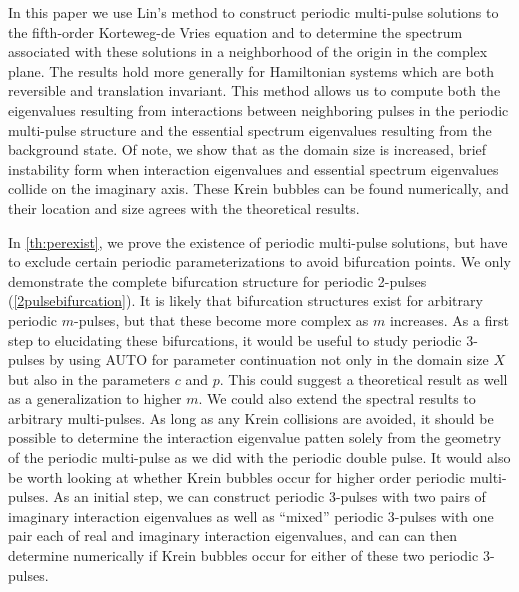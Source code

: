 \documentclass[10pt,reqno]{amsart}
\theoremstyle{plain}
\theoremstyle{definition}
\theoremstyle{remark}
\numberwithin{theorem}{section}
\numberwithin{equation}{section}
\begin{document}
In this paper we use Lin's method to construct periodic multi-pulse solutions to the fifth-order Korteweg-de Vries equation and to determine the spectrum associated with these solutions in a neighborhood of the origin in the complex plane. The results hold more generally for Hamiltonian systems which are both reversible and translation invariant. This method allows us to compute both the eigenvalues resulting from interactions between neighboring pulses in the periodic multi-pulse structure and the essential spectrum eigenvalues resulting from the background state. Of note, we show that as the domain size is increased, brief instability form when interaction eigenvalues and essential spectrum eigenvalues collide on the imaginary axis. These Krein bubbles can be found numerically, and their location and size agrees with the theoretical results.

In \cref{th:perexist}, we prove the existence of periodic multi-pulse solutions, but have to exclude certain periodic parameterizations to avoid bifurcation points. We only demonstrate the complete bifurcation structure for periodic 2-pulses (\cref{2pulsebifurcation}). It is likely that bifurcation structures exist for arbitrary periodic $m$-pulses, but that these become more complex as $m$ increases. As a first step to elucidating these bifurcations, it would be useful to study periodic 3-pulses by using AUTO for parameter continuation not only in the domain size $X$ but also in the parameters $c$ and $p$. This could suggest a theoretical result as well as a generalization to higher $m$. We could also extend the spectral results to arbitrary multi-pulses. As long as any Krein collisions are avoided, it should be possible to determine the interaction eigenvalue patten solely from the geometry of the periodic multi-pulse as we did with the periodic double pulse. It would also be worth looking at whether Krein bubbles occur for higher order periodic multi-pulses. As an initial step, we can construct periodic 3-pulses with two pairs of imaginary interaction eigenvalues as well as ``mixed'' periodic 3-pulses with one pair each of real and imaginary interaction eigenvalues, and can can then determine numerically if Krein bubbles occur for either of these two periodic 3-pulses.
\end{document}
